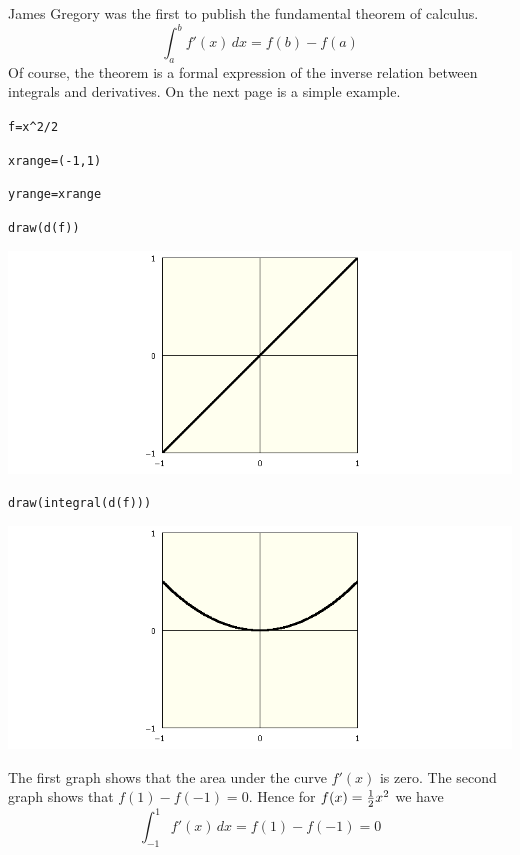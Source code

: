 \noindent
James Gregory was the first to publish the fundamental theorem of calculus.
$$\int_a^b f'(x)\,dx=f(b)-f(a)$$
Of course, the theorem is a formal expression of the inverse relation between integrals and derivatives.
On the next page is a simple example.

\newpage

\verb$f=x^2/2$

\verb$xrange=(-1,1)$

\verb$yrange=xrange$

\verb$draw(d(f))$

\noindent
\includegraphics[scale=0.5]{funda1.png}

\verb$draw(integral(d(f)))$

\medskip
\noindent
\includegraphics[scale=0.5]{funda2.png}

\medskip
\noindent
The first graph shows that the area under the curve $f'(x)$ is zero.
The second graph shows that $f(1)-f(-1)=0$.
Hence for $f(x)={1\over2}x^2$ we have
$$\int_{-1}^1f'(x)\,dx=f(1)-f(-1)=0$$


